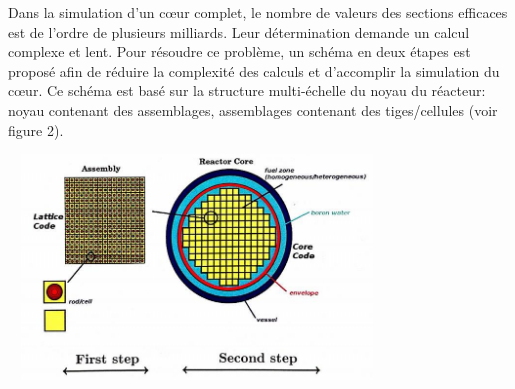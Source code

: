 Dans la simulation d'un cœur complet, le nombre de valeurs des sections efficaces est de l'ordre
de plusieurs milliards. Leur détermination demande un calcul complexe et lent.
Pour résoudre ce problème, un schéma en deux étapes est proposé afin de réduire la complexité
des calculs et d'accomplir la simulation du cœur. Ce schéma est basé sur la structure multi-échelle
du noyau du réacteur: noyau contenant des assemblages, assemblages contenant des tiges/cellules (voir figure 2).
\begin{center}
\includegraphics[height=6cm,width=10cm]{images/figure2.jpg}
\end{center}

